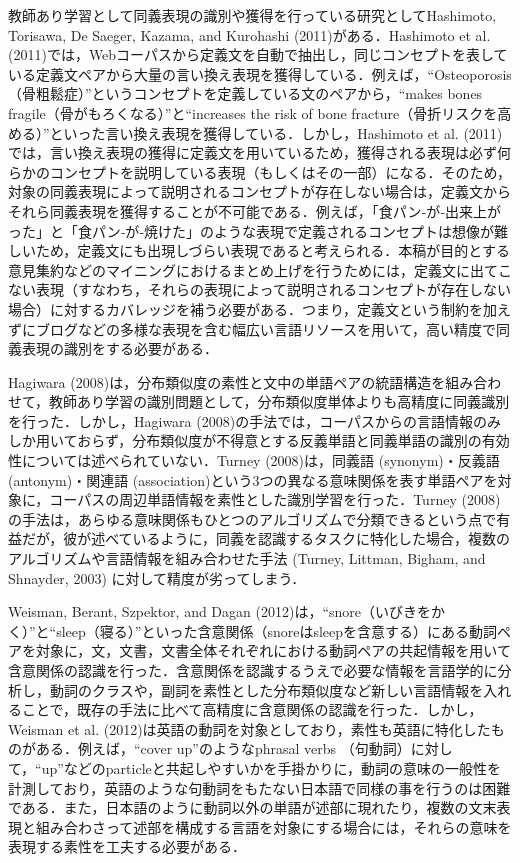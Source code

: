 \documentclass[japanese]{jnlp_1.4}
\begin{document}
教師あり学習として同義表現の識別や獲得を行っている研究としてHashimoto, Torisawa, De Saeger, Kazama, and Kurohashi (2011)がある．Hashimoto et al. (2011)では，Webコーパスから定義文を自動で抽出し，同じコンセプトを表している定義文ペアから大量の言い換え表現を獲得している．例えば，``Osteoporosis（骨粗鬆症）''というコンセプトを定義している文のペアから，``makes bones fragile（骨がもろくなる）''と``increases the risk of bone fracture（骨折リスクを高める）''といった言い換え表現を獲得している．しかし，Hashimoto et al. (2011)では，言い換え表現の獲得に定義文を用いているため，獲得される表現は必ず何らかのコンセプトを説明している表現（もしくはその一部）になる．そのため，対象の同義表現によって説明されるコンセプトが存在しない場合は，定義文からそれら同義表現を獲得することが不可能である．例えば，「食パン‐が‐出来上がった」と「食パン‐が‐焼けた」のような表現で定義されるコンセプトは想像が難しいため，定義文にも出現しづらい表現であると考えられる．本稿が目的とする意見集約などのマイニングにおけるまとめ上げを行うためには，定義文に出てこない表現（すなわち，それらの表現によって説明されるコンセプトが存在しない場合）に対するカバレッジを補う必要がある．つまり，定義文という制約を加えずにブログなどの多様な表現を含む幅広い言語リソースを用いて，高い精度で同義表現の識別をする必要がある．

Hagiwara (2008)は，分布類似度の素性と文中の単語ペアの統語構造を組み合わせて，教師あり学習の識別問題として，分布類似度単体よりも高精度に同義識別を行った．しかし，Hagiwara (2008)の手法では，コーパスからの言語情報のみしか用いておらず，分布類似度が不得意とする反義単語と同義単語の識別の有効性については述べられていない．Turney (2008)は，同義語 (synonym)・反義語 (antonym)・関連語 (association)という3つの異なる意味関係を表す単語ペアを対象に，コーパスの周辺単語情報を素性とした識別学習を行った．Turney (2008)の手法は，あらゆる意味関係もひとつのアルゴリズムで分類できるという点で有益だが，彼が述べているように，同義を認識するタスクに特化した場合，複数のアルゴリズムや言語情報を組み合わせた手法 (Turney, Littman, Bigham, and Shnayder, 2003) に対して精度が劣ってしまう．

Weisman, Berant, Szpektor, and Dagan (2012)は，``snore（いびきをかく）''と``sleep（寝る）''といった含意関係（snoreはsleepを含意する）にある動詞ペアを対象に，文，文書，文書全体それぞれにおける動詞ペアの共起情報を用いて含意関係の認識を行った．含意関係を認識するうえで必要な情報を言語学的に分析し，動詞のクラスや，副詞を素性とした分布類似度など新しい言語情報を入れることで，既存の手法に比べて高精度に含意関係の認識を行った．しかし，Weisman et al. (2012)は英語の動詞を対象としており，素性も英語に特化したものがある．例えば，``cover up''のようなphrasal verbs （句動詞）に対して，``up''などのparticleと共起しやすいかを手掛かりに，動詞の意味の一般性を計測しており，英語のような句動詞をもたない日本語で同様の事を行うのは困難である．また，日本語のように動詞以外の単語が述部に現れたり，複数の文末表現と組み合わさって述部を構成する言語を対象にする場合には，それらの意味を表現する素性を工夫する必要がある．
\end{document}
